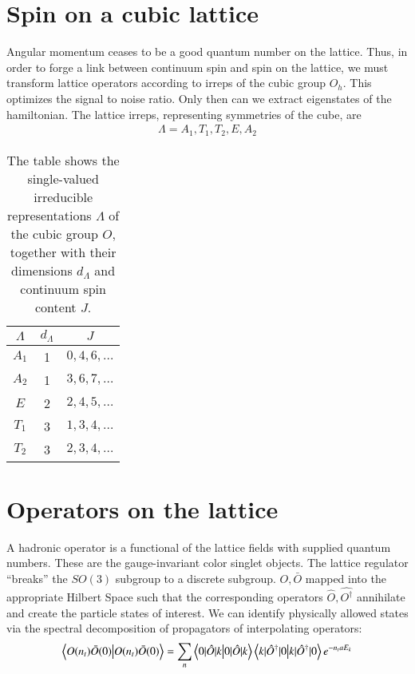 \section{Spin on a cubic lattice}
Angular momentum ceases to be a good quantum number on the lattice. Thus, in order to forge a link between continuum spin and spin on the lattice, we must transform lattice operators according to irreps of the cubic group $O_h$. This optimizes the signal to noise ratio. Only then can we extract eigenstates of the hamiltonian. The lattice irreps, representing symmetries of the cube, are
\begin{align}
    \Lambda = {A_1,T_1,T_2,E,A_2}
\end{align}
\begin{table}
    \centering
    \begin{tabular}{ccc}
    $\Lambda$ & $d_{\Lambda}$ & $J$\\ \hline
    $A_1$ & 1 & $0,4,6,\dots$\\
    $A_2$ & 1 & $3,6,7,\dots$\\
    $E$ & 2 & $2,4,5,\dots$\\
    $T_1$ & 3 & $1,3,4,\dots$\\
    $T_2$ & 3 & $2,3,4,\dots$\\ \hline
    \end{tabular}
    \caption{The table shows the single-valued irreducible representations
      $\Lambda$ of the cubic group $O$, together with their dimensions
      $d_\Lambda$ and continuum spin content $J$\protect.\label{tab:irrep}}
    \end{table}

\section{Operators on the lattice}
A hadronic operator is a functional of the lattice fields with supplied quantum numbers. These are the gauge-invariant color singlet objects. The lattice regulator ``breaks'' the $SO(3)$ subgroup to a discrete subgroup. $O,\bar{O}$ mapped into the appropriate Hilbert Space such that the corresponding operators $\hat{O} ,\hat{O^\dagger}$  annihilate and create the particle states of interest. We can identify physically allowed states via the spectral decomposition of propagators of interpolating operators: 
\begin{equation}
\braket{O(n_t)\bar{O}(0)} = \sum_{n}\braket{0|\hat{O}|k} \braket{k|\hat{O}^{\dagger}|0} e^{-n_taE_k}
\end{equation}

